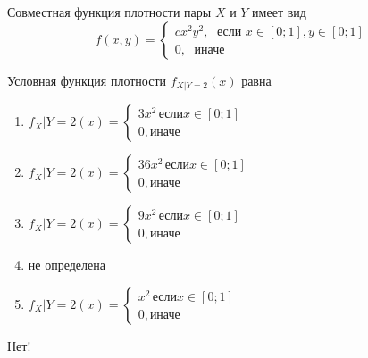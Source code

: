 \documentclass[t]{beamer}
\begin{document}
 \begin{frame} \label{22-No} 
\begin{block}{22} 

Совместная функция плотности пары $X$ и $Y$ имеет вид
\[
f(x,y)=\begin{cases}
cx^2y^2, \; \text{ если } x\in[0;1], y\in [0;1] \\
0, \; \text{ иначе}
\end{cases}
\]

\vspace{0.5cm} 
 
 
Условная функция плотности  $f_{X|Y=2}(x)$ равна
 


 \end{block} 
\begin{enumerate} 
\item[] \hyperlink{22-No}{\beamergotobutton{} $f_X|Y=2(x)=\begin{cases} 3x^2\, \text{если}  x\in [0;1] \\ 0, \text{иначе}     \end{cases}$}
\item[] \hyperlink{22-No}{\beamergotobutton{} $f_X|Y=2(x)=\begin{cases} 36x^2\, \text{если}  x\in [0;1] \\ 0, \text{иначе}     \end{cases}$}
\item[] \hyperlink{22-No}{\beamergotobutton{} $f_X|Y=2(x)=\begin{cases} 9x^2\, \text{если}  x\in [0;1] \\ 0, \text{иначе}     \end{cases}$}
\item[] \hyperlink{22-Yes}{\beamergotobutton{} не определена}
\item[] \hyperlink{22-No}{\beamergotobutton{} $f_X|Y=2(x)=\begin{cases} x^2\, \text{если}  x\in [0;1] \\ 0, \text{иначе}     \end{cases}$}
\end{enumerate} 

 \alert{Нет!} 
\end{frame} 
\end{document}
